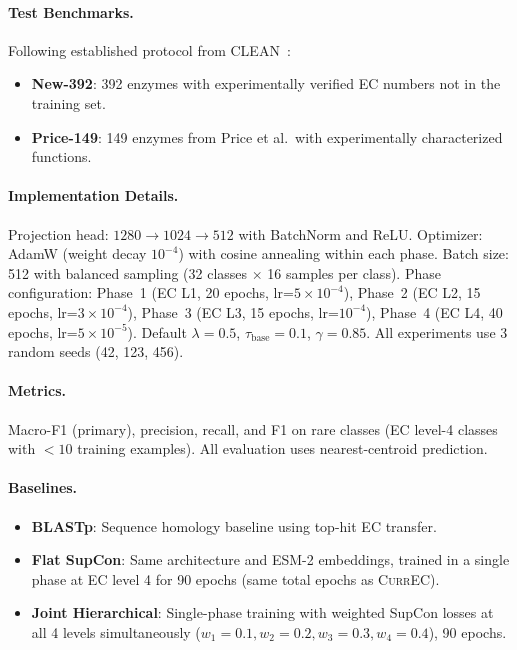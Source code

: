 \documentclass{article}
\newcommand{\currec}{\textsc{CurrEC}}
\begin{document}
\paragraph{Test Benchmarks.} Following established protocol from CLEAN~\citep{yu2023enzyme}:
\begin{itemize}
    \item \textbf{New-392}: 392 enzymes with experimentally verified EC numbers not in the training set.
    \item \textbf{Price-149}: 149 enzymes from Price et al.\ with experimentally characterized functions.
\end{itemize}

\paragraph{Implementation Details.} Projection head: $1280 \rightarrow 1024 \rightarrow 512$ with BatchNorm and ReLU. Optimizer: AdamW (weight decay $10^{-4}$) with cosine annealing within each phase. Batch size: 512 with balanced sampling (32 classes $\times$ 16 samples per class). Phase configuration: Phase~1 (EC L1, 20 epochs, lr=$5 \times 10^{-4}$), Phase~2 (EC L2, 15 epochs, lr=$3 \times 10^{-4}$), Phase~3 (EC L3, 15 epochs, lr=$10^{-4}$), Phase~4 (EC L4, 40 epochs, lr=$5 \times 10^{-5}$). Default $\lambda = 0.5$, $\tau_{\text{base}} = 0.1$, $\gamma = 0.85$. All experiments use 3 random seeds (42, 123, 456).

\paragraph{Metrics.} Macro-F1 (primary), precision, recall, and F1 on rare classes (EC level-4 classes with $< 10$ training examples). All evaluation uses nearest-centroid prediction.

\paragraph{Baselines.}
\begin{itemize}
    \item \textbf{BLASTp}: Sequence homology baseline using top-hit EC transfer.
    \item \textbf{Flat SupCon}: Same architecture and ESM-2 embeddings, trained in a single phase at EC level 4 for 90 epochs (same total epochs as \currec{}).
    \item \textbf{Joint Hierarchical}: Single-phase training with weighted SupCon losses at all 4 levels simultaneously ($w_1\!=\!0.1, w_2\!=\!0.2, w_3\!=\!0.3, w_4\!=\!0.4$), 90 epochs.
\end{itemize}
\end{document}
